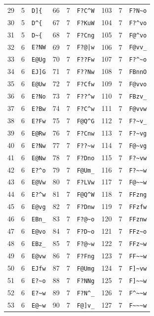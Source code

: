 \documentclass[11pt]{amsart}
\theoremstyle{definition}
\theoremstyle{remark}
\begin{document}
{\begin{longtable}{rcl@{\hspace{3em}}rcl@{\hspace{3em}}rcl}
29 & 5 & \verb!D]{! & 66 & 7 & \verb!F?C^W! & 103 & 7 & \verb!F?N~o! \\
30 & 5 & \verb!D^{! & 67 & 7 & \verb!F?KuW! & 104 & 7 & \verb!F?^vo! \\
31 & 5 & \verb!D~{! & 68 & 7 & \verb!F?Cng! & 105 & 7 & \verb!F@^vo! \\
32 & 6 & \verb!E?NW! & 69 & 7 & \verb!F?@|w! & 106 & 7 & \verb!F@vv_! \\
33 & 6 & \verb!E@Ug! & 70 & 7 & \verb!F??Fw! & 107 & 7 & \verb!F?^~o! \\
34 & 6 & \verb!EJ]G! & 71 & 7 & \verb!F??Nw! & 108 & 7 & \verb!FBnnO! \\
35 & 6 & \verb!E@Uw! & 72 & 7 & \verb!F?Cfw! & 109 & 7 & \verb!F@vvo! \\
36 & 6 & \verb!E?No! & 73 & 7 & \verb!F??^w! & 110 & 7 & \verb!FBzv_! \\
37 & 6 & \verb!E?Bw! & 74 & 7 & \verb!F?C^w! & 111 & 7 & \verb!F@vvw! \\
38 & 6 & \verb!E?Fw! & 75 & 7 & \verb!F@Q^G! & 112 & 7 & \verb!F?~v_! \\
39 & 6 & \verb!E@Rw! & 76 & 7 & \verb!F?Cnw! & 113 & 7 & \verb!F?~vg! \\
40 & 6 & \verb!E?Nw! & 77 & 7 & \verb!F??~w! & 114 & 7 & \verb!F@~vg! \\
41 & 6 & \verb!E@Nw! & 78 & 7 & \verb!F?Dno! & 115 & 7 & \verb!F?~vw! \\
42 & 6 & \verb!E?^o! & 79 & 7 & \verb!F@Um_! & 116 & 7 & \verb!F?~~w! \\
43 & 6 & \verb!E@Vw! & 80 & 7 & \verb!F?LVw! & 117 & 7 & \verb!F@~~w! \\
44 & 6 & \verb!E?^w! & 81 & 7 & \verb!F@Q^W! & 118 & 7 & \verb!FFzng! \\
45 & 6 & \verb!E@vg! & 82 & 7 & \verb!F?Dnw! & 119 & 7 & \verb!FFzfw! \\
46 & 6 & \verb!EBn_! & 83 & 7 & \verb!F?@~o! & 120 & 7 & \verb!FFznw! \\
47 & 6 & \verb!E@vo! & 84 & 7 & \verb!F?D~o! & 121 & 7 & \verb!FFz~o! \\
48 & 6 & \verb!EBz_! & 85 & 7 & \verb!F?@~w! & 122 & 7 & \verb!FFz~w! \\
49 & 6 & \verb!E@vw! & 86 & 7 & \verb!F?Fng! & 123 & 7 & \verb!FF~~w! \\
50 & 6 & \verb!EJfw! & 87 & 7 & \verb!F@Umg! & 124 & 7 & \verb!F]~vw! \\
51 & 6 & \verb!E?~o! & 88 & 7 & \verb!F?NNg! & 125 & 7 & \verb!F]~~w! \\
52 & 6 & \verb!E?~w! & 89 & 7 & \verb!F?N^_! & 126 & 7 & \verb!F^~~w! \\
53 & 6 & \verb!E@~w! & 90 & 7 & \verb!F@]v_! & 127 & 7 & \verb!F~~~w! \\
\end{longtable}
}
\end{document}
